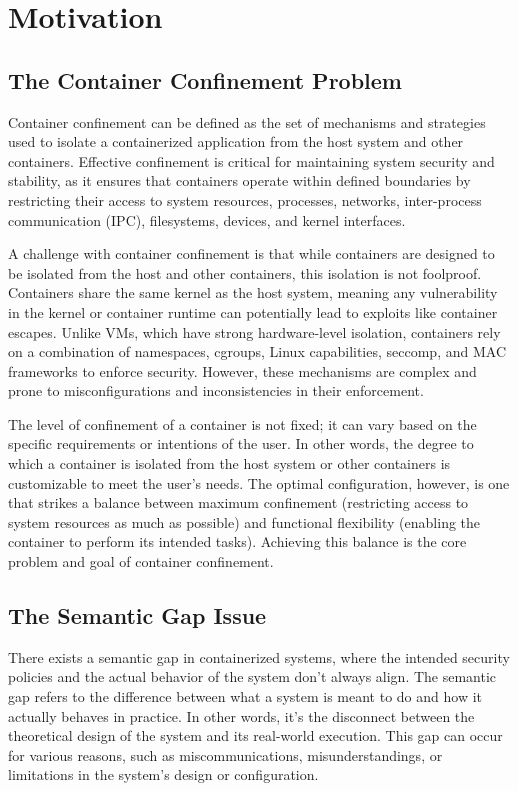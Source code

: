 \section{Motivation}
\label{sec:confinement}

\subsection{The Container Confinement Problem}

Container confinement can be defined as the set of mechanisms and strategies used to isolate a containerized application from the host system and other containers. Effective confinement is critical for maintaining system security and stability, as it ensures that containers operate within defined boundaries by restricting their access to system resources, processes, networks, inter-process communication (IPC), filesystems, devices, and kernel interfaces. 

A challenge with container confinement is that while containers are designed to be isolated from the host and other containers, this isolation is not foolproof. Containers share the same kernel as the host system, meaning any vulnerability in the kernel or container runtime can potentially lead to exploits like container escapes. Unlike VMs, which have strong hardware-level isolation, containers rely on a combination of namespaces, cgroups, Linux capabilities, seccomp, and MAC frameworks to enforce security. However, these mechanisms are complex and prone to misconfigurations and inconsistencies in their enforcement.

The level of confinement of a container is not fixed; it can vary based on the specific requirements or intentions of the user. In other words, the degree to which a container is isolated from the host system or other containers is customizable to meet the user’s needs. The optimal configuration, however, is one that strikes a balance between maximum confinement (restricting access to system resources as much as possible) and functional flexibility (enabling the container to perform its intended tasks). Achieving this balance is the core problem and goal of container confinement. 

\subsection{The Semantic Gap Issue}

There exists a semantic gap in containerized systems, where the intended security policies and the actual behavior of the system don't always align. The semantic gap refers to the difference between what a system is meant to do and how it actually behaves in practice. In other words, it’s the disconnect between the theoretical design of the system and its real-world execution. This gap can occur for various reasons, such as miscommunications, misunderstandings, or limitations in the system's design or configuration.

